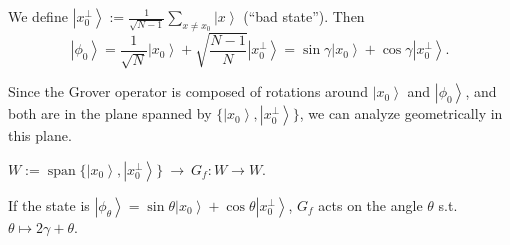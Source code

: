 \documentclass[11pt,a4paper]{article}
\renewcommand{\ket}[1]{\left|#1\right\rangle}
\begin{document}
We define $\ket{x_0^\perp} := \frac{1}{\sqrt{N-1}}\sum_{x\neq x_0}\ket{x}$ (``bad state''). Then
\[
\ket{\phi_0} = \frac{1}{\sqrt N}\ket{x_0} + \sqrt{\frac{N-1}{N}}\ket{x_0^\perp} = \sin\gamma\ket{x_0} + \cos\gamma\ket{x_0^\perp}.
\]

\begin{minipage}{0.4\textwidth}
\centering
{}
\end{minipage}\hfill
\begin{minipage}{0.55\textwidth}
Since the Grover operator is composed of rotations around $\ket{x_0}$ and $\ket{\phi_0}$, and both are in the plane spanned by $\{\ket{x_0},\ket{x_0^\perp}\}$, we can analyze geometrically in this plane.
\end{minipage}

\medskip
$W := \operatorname{span}\{\ket{x_0},\ket{x_0^\perp}\}\ \to\ G_f: W\to W$.

If the state is $\ket{\phi_\theta} = \sin\theta\ket{x_0} + \cos\theta\ket{x_0^\perp}$, $G_f$ acts on the angle $\theta$ s.t.\ $\theta\mapsto 2\gamma+\theta$.
\end{document}
